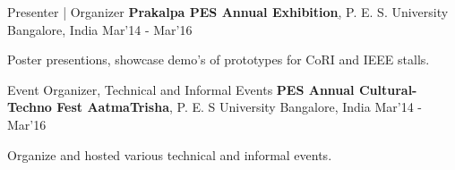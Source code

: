 \begin{cventries}

	\cventry
	{Presenter | Organizer}
	{\textbf{Prakalpa PES Annual Exhibition}\href{http://pes.edu/clubs/prakalpa/}, P. E. S. University}
	{Bangalore, India}
	{Mar'14 - Mar'16}
	{
		\begin{cvitems}
		\item{Poster presentions, showcase demo's of prototypes for CoRI and IEEE stalls.}
		\end{cvitems}
	}

	\cventry
	{Event Organizer, Technical and Informal Events}
	{\textbf{PES Annual Cultural- Techno Fest AatmaTrisha}\href{http://pes.edu/clubs/atmatrisha/}, P. E. S University}
	{Bangalore, India}
	{Mar'14 - Mar'16}
	{
		\begin{cvitems}
		\item{Organize and hosted various technical and informal events.}
		\end{cvitems}
	}

\end{cventries}
